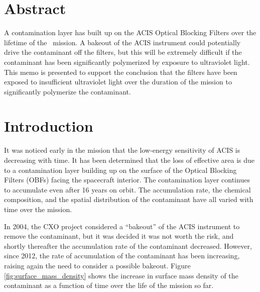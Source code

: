 \documentclass[11pt]{article}
\begin{document}


\Date{\today}


\memo{}

\section{Abstract}

A contamination layer has built up on the ACIS Optical Blocking Filters over the
lifetime of the \chandra~mission. A bakeout of the ACIS instrument could potentially
drive the contaminant off the filters, but this will be extremely difficult if the
contaminant has been significantly polymerized by exposure to ultraviolet light.
This memo is presented to support the conclusion that the filters have been exposed
to insufficient ultraviolet light over the duration of the mission to significantly
polymerize the contaminant.

\section{Introduction}

It was noticed early in the mission that the low-energy sensitivity of ACIS is
decreasing with time. It has been determined that the loss of effective area is
due to a contamination layer building up on the surface of the Optical Blocking
Filters (OBFs) facing the spacecraft interior. The contamination layer continues
to accumulate even after 16 years on orbit. The accumulation rate, the chemical
composition, and the spatial distribution of the contaminant have all varied with
time over the mission.

In 2004, the CXO project considered a ``bakeout'' of the ACIS instrument to remove
the contaminant, but it was decided it was not worth the risk, and shortly thereafter
the accumulation rate of the contaminant decreased. However, since 2012, the rate of
accumulation of the contaminant has been increasing, raising again the need to consider
a possible bakeout. Figure \ref{fig:surface_mass_density} shows the increase in surface mass
density of the contaminant as a function of time over the life of the mission so far.
\end{document}
